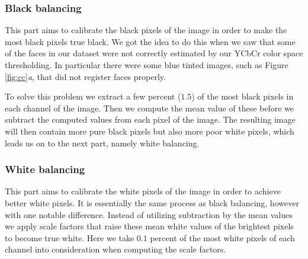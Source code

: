 \subsubsection{Black balancing}
This part aims to calibrate the black pixels of the image in order to make the most black pixels true black. We got the idea to do this when we saw that some of the faces in our dataset were not correctly estimated by our YCbCr color space thresholding. In particular there were some blue tinted images, such as Figure \ref{fig:cc}\textit{a}, that did not register faces properly. 

To solve this problem we extract a few percent ($1.5$) of the most black pixels in each channel of the image. Then we compute the mean value of these before we subtract the computed values from each pixel of the image. The resulting image will then contain more pure black pixels but also more poor white pixels, which leads us on to the next part, namely white balancing.


\subsubsection{White balancing}
This part aims to calibrate the white pixels of the image in order to achieve better white pixels. It is essentially the same process as black balancing, however with one notable difference. Instead of utilizing subtraction by the mean values we apply scale factors that raise these mean white values of the brightest pixels to become true white. Here we take $0.1$ percent of the most white pixels of each channel into consideration when computing the scale factors.